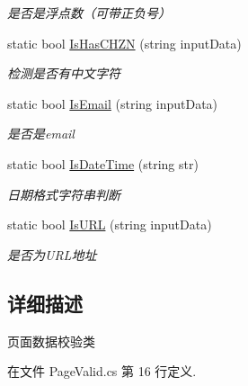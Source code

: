 \begin{DoxyCompactItemize}
\begin{DoxyCompactList}\small\item\em 是否是浮点数（可带正负号） \end{DoxyCompactList}\item 
static bool \hyperlink{class_x_c_l_net_tools_1_1_string_hander_1_1_page_valid_a13211b08f74ed73f0ea6483eb065aeb3}{Is\-Has\-C\-H\-Z\-N} (string input\-Data)
\begin{DoxyCompactList}\small\item\em 检测是否有中文字符 \end{DoxyCompactList}\item 
static bool \hyperlink{class_x_c_l_net_tools_1_1_string_hander_1_1_page_valid_a937e79914e914c2c820f5c9af0273c6e}{Is\-Email} (string input\-Data)
\begin{DoxyCompactList}\small\item\em 是否是email \end{DoxyCompactList}\item 
static bool \hyperlink{class_x_c_l_net_tools_1_1_string_hander_1_1_page_valid_ad5e0e978f61e949d4d6548fc3509cdea}{Is\-Date\-Time} (string str)
\begin{DoxyCompactList}\small\item\em 日期格式字符串判断 \end{DoxyCompactList}\item 
static bool \hyperlink{class_x_c_l_net_tools_1_1_string_hander_1_1_page_valid_a1b7a8a961ee9d599e74d29301475d69e}{Is\-U\-R\-L} (string input\-Data)
\begin{DoxyCompactList}\small\item\em 是否为\-U\-R\-L地址 \end{DoxyCompactList}\end{DoxyCompactItemize}


\subsection{详细描述}
页面数据校验类 



在文件 Page\-Valid.\-cs 第 16 行定义.



